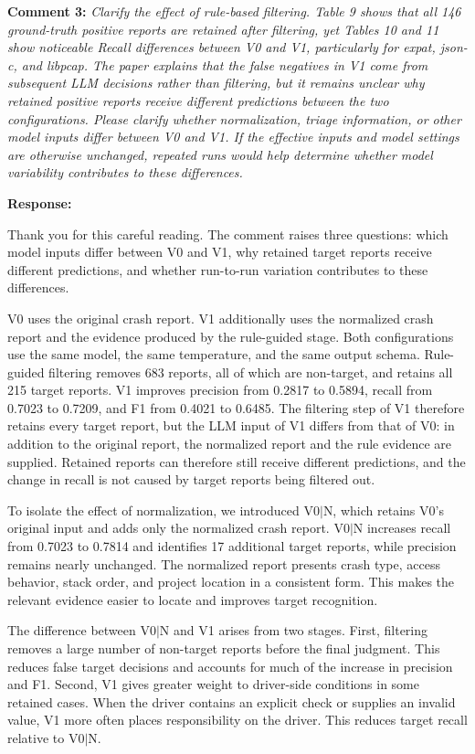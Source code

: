 \documentclass[onecolumn,11pt]{article}
\newcommand{\secc}[2]{\par\mySep \noindent \textsf{\textbf{#1 }}\textit{#2}\par}
\newcommand{\secr}[2]{\par\mySep \noindent \textsf{\textbf{#1 }}{#2}\par}
\newcommand{\mySep}{\vspace{8pt}}
\begin{document}
\secc{Comment 3:}{Clarify the effect of rule-based filtering. Table 9 shows that all 146 ground-truth positive reports are retained after filtering, yet Tables 10 and 11 show noticeable Recall differences between V0 and V1, particularly for expat, json-c, and libpcap. The paper explains that the false negatives in V1 come from subsequent LLM decisions rather than filtering, but it remains unclear why retained positive reports receive different predictions between the two configurations. Please clarify whether normalization, triage information, or other model inputs differ between V0 and V1. If the effective inputs and model settings are otherwise unchanged, repeated runs would help determine whether model variability contributes to these differences.}
\secr{Response:}{Thank you for this careful reading. The comment raises three questions: which model inputs differ between V0 and V1, why retained target reports receive different predictions, and whether run-to-run variation contributes to these differences.

V0 uses the original crash report. V1 additionally uses the normalized crash report and the evidence produced by the rule-guided stage. Both configurations use the same model, the same temperature, and the same output schema. Rule-guided filtering removes 683 reports, all of which are non-target, and retains all 215 target reports. V1 improves precision from 0.2817 to 0.5894, recall from 0.7023 to 0.7209, and F1 from 0.4021 to 0.6485. The filtering step of V1 therefore retains every target report, but the LLM input of V1 differs from that of V0: in addition to the original report, the normalized report and the rule evidence are supplied. Retained reports can therefore still receive different predictions, and the change in recall is not caused by target reports being filtered out.

To isolate the effect of normalization, we introduced V0$\mid$N, which retains V0's original input and adds only the normalized crash report. V0$\mid$N increases recall from 0.7023 to 0.7814 and identifies 17 additional target reports, while precision remains nearly unchanged. The normalized report presents crash type, access behavior, stack order, and project location in a consistent form. This makes the relevant evidence easier to locate and improves target recognition.

The difference between V0$\mid$N and V1 arises from two stages. First, filtering removes a large number of non-target reports before the final judgment. This reduces false target decisions and accounts for much of the increase in precision and F1. Second, V1 gives greater weight to driver-side conditions in some retained cases. When the driver contains an explicit check or supplies an invalid value, V1 more often places responsibility on the driver. This reduces target recall relative to V0$\mid$N.

}
\end{document}
